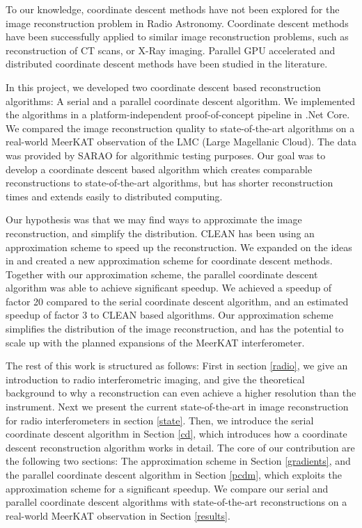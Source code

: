 To our knowledge, coordinate descent methods have not been explored for the image reconstruction problem in Radio Astronomy. Coordinate descent methods have been successfully applied to similar image reconstruction problems, such as reconstruction of CT scans\cite{bouman1996unified}, or X-Ray imaging\cite{felix2017compressed}. Parallel \cite{richtarik2016parallel} GPU accelerated\cite{mcgaffin2015edge} and distributed\cite{fercoq2014fast} coordinate descent methods have been studied in the literature. 

In this project, we developed two coordinate descent based reconstruction algorithms: A serial and a parallel coordinate descent algorithm. We implemented the algorithms in a platform-independent proof-of-concept pipeline in .Net Core. We compared the image reconstruction quality to state-of-the-art algorithms on a real-world MeerKAT observation of the LMC (Large Magellanic Cloud). The data was provided by SARAO for algorithmic testing purposes. Our goal was to develop a coordinate descent based algorithm which creates comparable reconstructions to state-of-the-art algorithms, but has shorter reconstruction times and extends easily to distributed computing.

Our hypothesis was that we may find ways to approximate the image reconstruction, and simplify the distribution. CLEAN \cite{clark1980efficient} has been using an approximation scheme to speed up the reconstruction. We expanded on the ideas in \cite{clark1980efficient} and created a new approximation scheme for coordinate descent methods. Together with our approximation scheme, the parallel coordinate descent algorithm was able to achieve significant speedup. We achieved a speedup of factor 20 compared to the serial coordinate descent algorithm, and an estimated speedup of factor 3 to CLEAN based algorithms. Our approximation scheme simplifies the distribution of the image reconstruction, and has the potential to scale up with the planned expansions of the MeerKAT interferometer.

The rest of this work is structured as follows: First in section \ref{radio}, we give an introduction to radio interferometric imaging, and give the theoretical background to why a reconstruction can even achieve a higher resolution than the instrument. Next we present the current state-of-the-art in image reconstruction for radio interferometers in section \ref{state}. Then, we introduce the serial coordinate descent algorithm in Section \ref{cd}, which introduces how a coordinate descent reconstruction algorithm works in detail. The core of our contribution are the following two sections: The approximation scheme in Section \ref{gradients}, and the parallel coordinate descent algorithm in Section \ref{pcdm}, which exploits the approximation scheme for a significant speedup. We compare our serial and parallel coordinate descent algorithms with state-of-the-art reconstructions on a real-world MeerKAT observation in Section \ref{results}. 

